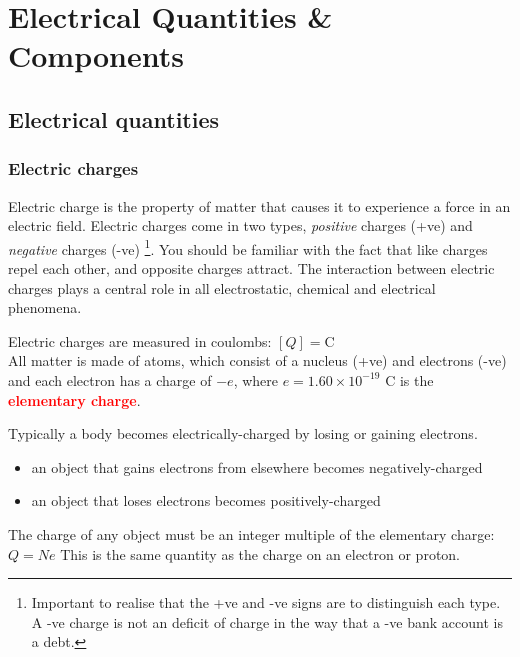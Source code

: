 \documentclass[a4paper,12pt]{book}
\newcommand{\keypoint}[1]{\textbf{\textcolor{red}{#1}}}
\newcommand{\tcbhighmath}[1]{\boxed{#1}}
\newcommand{\keypoint}[1]{\textbf{\textcolor{red}{#1}}}
\begin{document}
\cleardoublepage

\chapter{Electrical Quantities \& Components}

\section{Electrical quantities}

\subsection{Electric charges}

Electric charge is the property of matter that causes it to experience a force in an electric field.  Electric charges come in two types, \emph{positive} charges (+ve) and \emph{negative} charges (-ve) \footnote{Important to realise that the +ve and -ve signs are to distinguish each type. A -ve charge is not an deficit of charge in the way that a -ve bank account is a debt.}. You should be familiar with the fact that like charges repel each other, and opposite charges attract. The interaction between electric charges plays a central role in all electrostatic, chemical and electrical phenomena.

Electric charges are measured in coulombs: $[Q] = \text{C}$\\

All matter is made of atoms, which consist of a nucleus (+ve) and electrons (-ve) and each electron has a charge of $-e$, where $e=1.60\times10^{-19}\text{ C}$ is the \keypoint{elementary charge}.

Typically a body becomes electrically-charged by losing or gaining electrons.

\begin{itemize}
	\item[--] an object that gains electrons from elsewhere becomes negatively-charged
	
	\item[--] an object that loses electrons becomes positively-charged
\end{itemize}

The charge of any object must be an integer multiple of the elementary charge: $\tcbhighmath{Q=Ne}$ This is the same quantity as the charge on an electron or proton.
\end{document}
